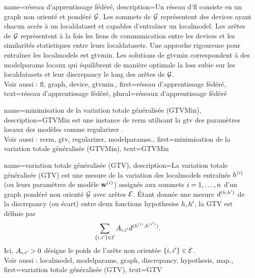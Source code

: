 {name={réseau d’apprentissage fédéré},
	description={Un réseau d'\gls{fl} consiste en un 
		\gls{graph} non orienté et pondéré $\mathcal{G}$. Les sommets de $\mathcal{G}$ représentent des \glspl{device} 
		ayant chacun accès à un \gls{localdataset} et capables d’entraîner un \gls{localmodel}. Les arêtes de $\mathcal{G}$ 
		représentent à la fois les liens de communication entre les \glspl{device} et les similarités statistiques 
		entre leurs \glspl{localdataset}. Une approche rigoureuse pour entraîner les \glspl{localmodel} est 
		\gls{gtvmin}. Les solutions de \gls{gtvmin} correspondent à des \glspl{modelparam} locaux qui équilibrent 
		de manière optimale la \gls{loss} subie sur les \glspl{localdataset} et leur \gls{discrepancy} le long des arêtes de $\mathcal{G}$.
		\\
		Voir aussi : \gls{fl}, \gls{graph}, \gls{device}, \gls{gtvmin}.},
	first={réseau d’apprentissage fédéré},
	text={réseau d'apprentissage fédéré}, plural={réseaux d'apprentissage fédéré}
}

{name={minimisation de la variation totale généralisée (GTVMin)},
	description={GTVMin est une instance 
		de \gls{rerm} utilisant la \gls{gtv} des paramètres locaux des modèles comme \gls{regularizer} 
		\cite{ClusteredFLTVMinTSP}.
		\\
		Voir aussi : \gls{rerm}, \gls{gtv}, \gls{regularizer}, \glspl{modelparams}.},
	first={minimisation de la variation totale généralisée (GTVMin)},
	text={GTVMin}
}

{name={variation totale généralisée (GTV)}, 
	description={La variation totale généralisée (GTV) est une mesure de la variation des \glspl{localmodel} entraînés $h^{(i)}$ (ou leurs paramètres de modèle $\mathbf{w}^{(i)}$) assignés aux sommets $i=1, \ldots, n$ d’un \gls{graph} pondéré non orienté $\mathcal{G}$ avec arêtes $\mathcal{E}$. Étant donnée une mesure $d^{(h,h')}$ de la \gls{discrepancy} (ou écart) entre deux fonctions \glspl{hypothesis} $h,h'$, la GTV est définie par
		\begin{equation}
			\nonumber
			\sum_{\{i,i'\}\in \mathcal{E}} A_{i,i'} 
			d^{(h^{(i)},h^{(i')})}.
		\end{equation}
		Ici, $A_{i,i'}>0$ désigne le poids de l’arête non orientée $\{i,i'\}\in \mathcal{E}$.
		\\
		Voir aussi : \gls{localmodel}, \glspl{modelparam}, \gls{graph}, \gls{discrepancy}, \gls{hypothesis}, \gls{map}.},
	first={variation totale généralisée (GTV)},
	text={GTV}
}


